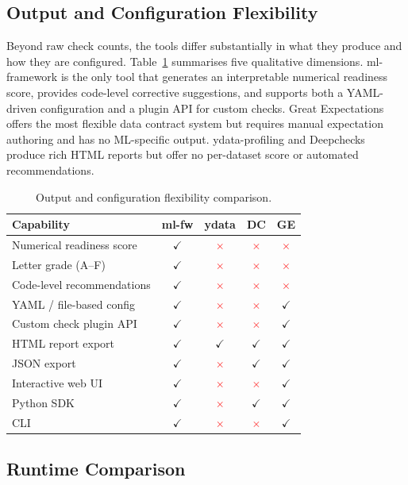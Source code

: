 \documentclass[11pt]{article}
\newcommand{\cmark}{\textbf{\textcolor{green!50!black}{$\checkmark$}}}
\newcommand{\xmark}{\textbf{\textcolor{red}{$\times$}}}
\begin{document}
\subsection{Output and Configuration Flexibility}

Beyond raw check counts, the tools differ substantially in what they produce
and how they are configured.  Table~\ref{tab:flexibility} summarises five
qualitative dimensions.  ml-framework is the only tool that generates an
interpretable numerical readiness score, provides code-level corrective
suggestions, and supports both a YAML-driven configuration and a plugin API
for custom checks.  Great Expectations offers the most flexible data
contract system but requires manual expectation authoring and has no
ML-specific output.  ydata-profiling and Deepchecks produce rich HTML
reports but offer no per-dataset score or automated recommendations.

\begin{table}[!h]
\centering
\caption{Output and configuration flexibility comparison.}
\label{tab:flexibility}
\scriptsize
\begin{tabular}{lcccc}
\toprule
\textbf{Capability} & \textbf{ml-fw} & \textbf{ydata} & \textbf{DC} & \textbf{GE} \\
\midrule
Numerical readiness score   & \cmark & \xmark & \xmark & \xmark \\
Letter grade (A--F)         & \cmark & \xmark & \xmark & \xmark \\
Code-level recommendations  & \cmark & \xmark & \xmark & \xmark \\
YAML / file-based config    & \cmark & \xmark & \xmark & \cmark \\
Custom check plugin API     & \cmark & \xmark & \xmark & \cmark \\
HTML report export          & \cmark & \cmark & \cmark & \cmark \\
JSON export                 & \cmark & \xmark & \cmark & \cmark \\
Interactive web UI          & \cmark & \xmark & \xmark & \cmark \\
Python SDK                  & \cmark & \xmark & \cmark & \cmark \\
CLI                         & \cmark & \xmark & \xmark & \cmark \\
\bottomrule
\end{tabular}
\end{table}

\subsection{Runtime Comparison}
\end{document}
